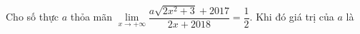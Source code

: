 \begin{ex}
Cho số thực $a$ thỏa mãn $\lim\limits_{x\to+\infty}\dfrac{a\sqrt{2x^2+3}+2017}{2x+2018}=\dfrac12$. Khi đó giá trị của $a$ là
\end{ex}
